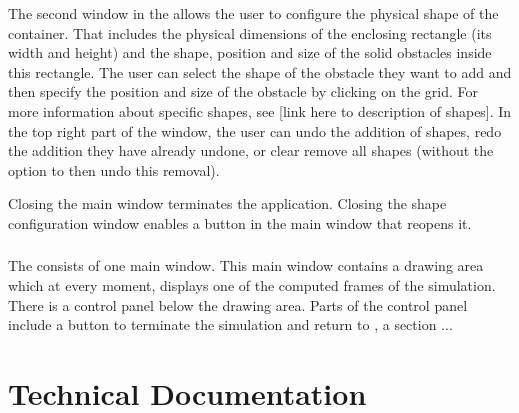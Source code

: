 \documentclass{article}
\newcommand{\vxlisp}{\vspace*{12pt}}
\begin{document}
The second window in the \ione{} allows the user to configure the physical shape of the container. That includes the physical dimensions of the enclosing rectangle (its width and height) and the shape, position and size of the solid obstacles inside this rectangle. The user can select the shape of the obstacle they want to add and then specify the position and size of the obstacle by clicking on the grid. For more information about specific shapes, see [link here to description of shapes]. In the top right part of the window, the user can undo the addition of shapes, redo the addition they have already undone, or clear remove all shapes (without the option to then undo this removal).
\vxlisp

Closing the main window terminates the application. Closing the shape configuration window enables a button in the main window that reopens it.

\subsubsection{\Itwo}\label{sec:i2}

The \itwo{} consists of one main window. This main window contains a drawing area which at every moment, displays one of the computed frames of the simulation. There is a control panel below the drawing area. Parts of the control panel include a button to terminate the simulation and return to \ione{}, a section  ...

\section{Technical Documentation}
\end{document}
